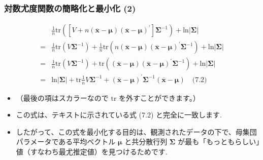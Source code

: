\documentclass{beamer}
\begin{document}
\begin{frame}
\frametitle{対数尤度関数の簡略化と最小化 (2)}
\begin{align*}
&\frac{1}{n}\text{tr}\left([V+n(\overline{\bm{x}}-\bm{\mu})(\overline{\bm{x}}-\bm{\mu})^{\prime}]\bm{\Sigma}^{-1}\right)+\text{ln}|\bm{\Sigma}| \\
=&\frac{1}{n}\text{tr}(V\bm{\Sigma}^{-1})+\frac{1}{n}\text{tr}(n(\overline{\bm{x}}-\bm{\mu})(\overline{\bm{x}}-\bm{\mu})^{\prime}\bm{\Sigma}^{-1})+\text{ln}|\bm{\Sigma}| \\
=&\frac{1}{n}\text{tr}(V\bm{\Sigma}^{-1})+\text{tr}((\overline{\bm{x}}-\bm{\mu})(\overline{\bm{x}}-\bm{\mu})^{\prime}\bm{\Sigma}^{-1})+\text{ln}|\bm{\Sigma}| \\
=&\text{ln}|\bm{\Sigma}|+\text{tr}\frac{1}{n}V\bm{\Sigma}^{-1}+(\overline{\bm{x}}-\bm{\mu})^{\prime}\bm{\Sigma}^{-1}(\overline{\bm{x}}-\bm{\mu}) \quad \text{(7.2)}
\end{align*}
\begin{itemize}
    \item （最後の項はスカラーなので $\text{tr}$ を外すことができます。）
    \item この式は、テキストに示されている式 (7.2) と完全に一致します.
    \item したがって、この式を最小化する目的は、観測されたデータの下で、母集団パラメータである平均ベクトル $\bm{\mu}$ と共分散行列 $\bm{\Sigma}$ が最も「もっともらしい」値（すなわち最尤推定値）を見つけるためです.
\end{itemize}
\end{frame}
\end{document}
